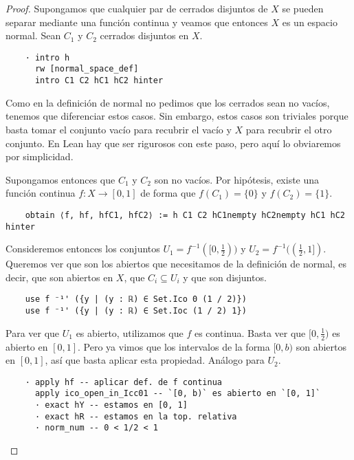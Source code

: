 \begin{proof}

  Supongamos que cualquier par de cerrados disjuntos de $X$ se pueden separar mediante una función continua y veamos que entonces $X$ es un espacio normal. Sean $C_1$ y $C_2$ cerrados disjuntos en $X$.

  \begin{lstlisting}
    · intro h
      rw [normal_space_def]
      intro C1 C2 hC1 hC2 hinter \end{lstlisting}

  Como en la definición de normal no pedimos que los cerrados sean no vacíos, tenemos que diferenciar estos casos. Sin embargo, estos casos son triviales porque basta tomar el conjunto vacío para recubrir el vacío y $X$ para recubrir el otro conjunto. En Lean hay que ser rigurosos con este paso, pero aquí lo obviaremos por simplicidad.

  Supongamos entonces que $C_1$ y $C_2$ son no vacíos. Por hipótesis, existe una función continua $f : X \to [0, 1]$ de forma que $f(C_1) = \{0\}$ y $f(C_2) = \{1\}$.

  \begin{lstlisting}
    obtain ⟨f, hf, hfC1, hfC2⟩ := h C1 C2 hC1nempty hC2nempty hC1 hC2 hinter \end{lstlisting}

  Consideremos entonces los conjuntos $U_1 = f^{-1}([0, \frac{1}{2}))$ y $U_2 = f^{-1}((\frac{1}{2}, 1])$. Queremos ver que son los abiertos que necesitamos de la definición de normal, es decir, que son abiertos en $X$, que $C_i \subseteq U_i$ y que son disjuntos.

  \begin{lstlisting}
    use f ⁻¹' ({y | (y : ℝ) ∈ Set.Ico 0 (1 / 2)})
    use f ⁻¹' ({y | (y : ℝ) ∈ Set.Ioc (1 / 2) 1}) \end{lstlisting}

  Para ver que $U_1$ es abierto, utilizamos que $f$ es continua. Basta ver que $[0, \frac{1}{2})$ es abierto en $[0, 1]$. Pero ya vimos que los intervalos de la forma $[0, b)$ son abiertos en $[0, 1]$, así que basta aplicar esta propiedad. Análogo para $U_2$.

  \begin{lstlisting}
    · apply hf -- aplicar def. de f continua
      apply ico_open_in_Icc01 -- `[0, b)` es abierto en `[0, 1]`
      · exact hY -- estamos en [0, 1]
      · exact hR -- estamos en la top. relativa
      · norm_num -- 0 < 1/2 < 1 \end{lstlisting}


\end{proof}
